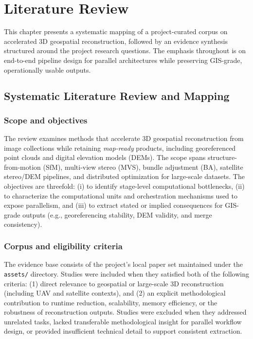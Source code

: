 \chapter{Literature Review}\label{chap:survey}

This chapter presents a systematic mapping of a project-curated corpus on accelerated 3D geospatial reconstruction, followed by an evidence synthesis structured around the project research questions. The emphasis throughout is on end-to-end pipeline design for parallel architectures while preserving GIS-grade, operationally usable outputs.

\section{Systematic Literature Review and Mapping}

\subsection{Scope and objectives}

The review examines methods that accelerate 3D geospatial reconstruction from image collections while retaining \emph{map-ready} products, including georeferenced point clouds and digital elevation models (DEMs). The scope spans structure-from-motion (SfM), multi-view stereo (MVS), bundle adjustment (BA), satellite stereo/DEM pipelines, and distributed optimization for large-scale datasets. The objectives are threefold: (i) to identify stage-level computational bottlenecks, (ii) to characterize the computational units and orchestration mechanisms used to expose parallelism, and (iii) to extract stated or implied consequences for GIS-grade outputs (e.g., georeferencing stability, DEM validity, and merge consistency).

\subsection{Corpus and eligibility criteria}

The evidence base consists of the project’s local paper set maintained under the \texttt{assets/} directory. Studies were included when they satisfied both of the following criteria: (1) direct relevance to geospatial or large-scale 3D reconstruction (including UAV and satellite contexts), and (2) an explicit methodological contribution to runtime reduction, scalability, memory efficiency, or the robustness of reconstruction outputs. Studies were excluded when they addressed unrelated tasks, lacked transferable methodological insight for parallel workflow design, or provided insufficient technical detail to support consistent extraction.

